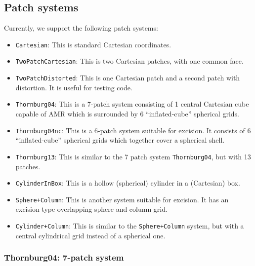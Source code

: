 \documentclass{article}
\begin{document}
\subsection{Patch systems}

Currently, we support the following patch systems:
\begin{itemize}
 \item {\tt Cartesian}: This is standard Cartesian coordinates.
 \item {\tt TwoPatchCartesian}: This is two Cartesian patches, with one common face.
 \item {\tt TwoPatchDistorted}: This is one Cartesian patch and a second patch with distortion. It is useful for testing code.
 \item {\tt Thornburg04}: This is a 7-patch system consisting of 1 central Cartesian cube capable of AMR which is surrounded by 6 ``inflated-cube'' spherical grids. 
 \item {\tt Thornburg04nc}: This is a 6-patch system suitable for excision. It consists of 6 ``inflated-cube'' spherical grids which together cover a spherical shell.
 \item {\tt Thornburg13}: This is similar to the 7 patch system {\tt Thornburg04}, but with 13 patches.
 \item {\tt CylinderInBox}: This is a hollow (spherical) cylinder in a (Cartesian) box.
 \item {\tt Sphere+Column}: This is another system suitable for excision. It has an excision-type overlapping sphere and column grid.
 \item {\tt Cylinder+Column}: This is similar to the {\tt Sphere+Column} system, but with a central cylindrical grid instead of a spherical one.
\end{itemize}

\subsubsection{Thornburg04: 7-patch system}
\end{document}
